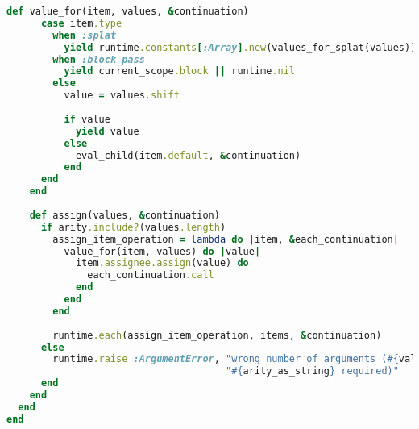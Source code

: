 \begin{lstlisting}[title={\small\ttfamily\bfseries ast/scopes.rb},language=Ruby]
    def value_for(item, values, &continuation)
      case item.type
        when :splat
          yield runtime.constants[:Array].new(values_for_splat(values))
        when :block_pass
          yield current_scope.block || runtime.nil
        else
          value = values.shift
          
          if value
            yield value
          else
            eval_child(item.default, &continuation)
          end
      end
    end
    
    def assign(values, &continuation)
      if arity.include?(values.length)
        assign_item_operation = lambda do |item, &each_continuation|
          value_for(item, values) do |value|
            item.assignee.assign(value) do
              each_continuation.call
            end
          end
        end
        
        runtime.each(assign_item_operation, items, &continuation)
      else
        runtime.raise :ArgumentError, "wrong number of arguments (#{values.length} supplied, " +
                                      "#{arity_as_string} required)"
      end
    end
  end
end

\end{lstlisting}
